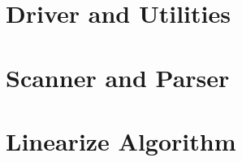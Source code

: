\documentclass[twoside]{report}
\begin{document}
\appendix
\chapter{Driver and Utilities}




\chapter{Scanner and Parser}


\chapter{Linearize Algorithm}


\fi
\end{document}
